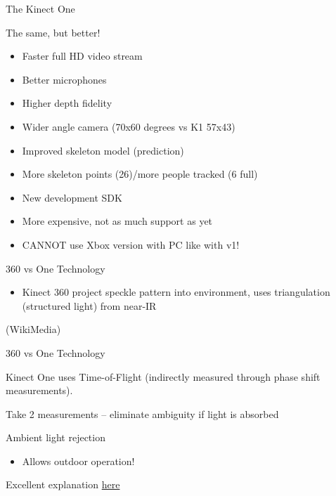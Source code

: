 \documentclass[compress]{beamer}
\providecommand{\tightlist}{%
  \setlength{\itemsep}{0pt}\setlength{\parskip}{0pt}}
\begin{document}
\begin{frame}{The Kinect One}

The same, but better!

\begin{itemize}
\tightlist
\item
  Faster full HD video stream
\item
  Better microphones
\item
  Higher depth fidelity
\item
  Wider angle camera (70x60 degrees vs K1 57x43)
\item
  Improved skeleton model (prediction)
\item
  More skeleton points (26)/more people tracked (6 full)
\item
  New development SDK
\item
  More expensive, not as much support as yet
\item
  CANNOT use Xbox version with PC like with v1!
\end{itemize}

\end{frame}

\begin{frame}{360 vs One Technology}

\begin{itemize}
\tightlist
\item
  Kinect 360 project speckle pattern into environment, uses
  triangulation (structured light) from near-IR
\end{itemize}

(WikiMedia)

\end{frame}

\begin{frame}{360 vs One Technology}

Kinect One uses Time-of-Flight (indirectly measured through phase shift
measurements).

Take 2 measurements -- eliminate ambiguity if light is absorbed

Ambient light rejection

\begin{itemize}
\tightlist
\item
  Allows outdoor operation!
\end{itemize}

Excellent explanation
\href{http://www.gamasutra.com/blogs/DanielLau/20131127/205820/The_Science_Behind_Kinects_or_Kinect_10_versus_20.php}{here}

\end{frame}
\end{document}
